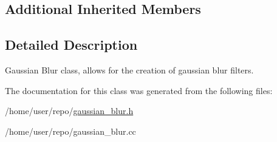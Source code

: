 \subsection*{Additional Inherited Members}


\subsection{Detailed Description}
Gaussian Blur class, allows for the creation of gaussian blur filters. 

The documentation for this class was generated from the following files\+:\begin{DoxyCompactItemize}
\item 
/home/user/repo/\hyperlink{gaussian__blur_8h}{gaussian\+\_\+blur.\+h}\item 
/home/user/repo/gaussian\+\_\+blur.\+cc\end{DoxyCompactItemize}
